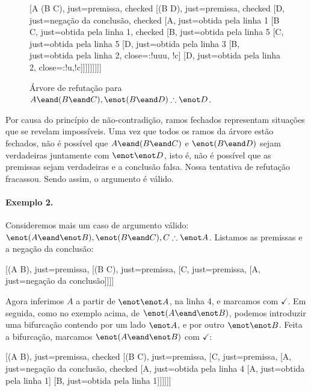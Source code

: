 \begin{figure}[h!]
\begin{center}
\begin{tableau}
	{
	}
	[A \eand (B \eand C), just={premissa}, checked
	[\enot(B \eand D), just={premissa}, checked
	[\enot \enot D, just={negação da conclusão}, checked
	[A, just={obtida pela linha 1}
	[B \eand C, just={obtida pela linha 1}, checked
	[B, just={obtida pela linha 5}
	[C, just={obtida pela linha 5}
	[D, just={obtida pela linha 3}
		[\enot B, just={obtida pela linha 2}, close={:!uuu, !c}]
		[\enot D, just={obtida pela linha 2}, close={:!u,!c}]]]]]]]]]
\end{tableau}
\end{center}
	\caption{Árvore de refutação para $A \eand (B \eand C), \enot(B \eand D) \therefore \enot D$.}
	\label{truth.trees.ex.1}
\end{figure}

Por causa do princípio de não-contradição, ramos fechados representam situações que se revelam impossíveis.
Uma vez que todos os ramos da árvore estão fechados, não é possível que $A \eand (B \eand C)$ e $\enot(B \eand D)$ sejam verdadeiras juntamente com $\enot \enot D$, isto é, não é possível que as premissas sejam verdadeiras e a conclusão falsa.
Nossa tentativa de refutação fracassou.
Sendo assim, o argumento é válido.

\paragraph{Exemplo 2.}
Consideremos mais um caso de argumento válido: $\enot(A \eand \enot B), \enot(B \eand C), C \therefore \enot A$.
Listamos as premissas e a negação da conclusão:

\begin{center}
	\begin{tableau}
		{
		}
		[\enot(A \eand \enot B), just=premissa, 
		[\enot(B \eand C), just=premissa, 
		[C, just=premissa, 
		[\enot \enot A, just={negação da conclusão}]]]]
	\end{tableau}
\end{center}

Agora inferimos $A$ a partir de $\enot \enot A$, na linha 4, e marcamos com $\checkmark$. 
Em seguida, como no exemplo acima, de $\enot(A \eand \enot B)$, podemos introduzir uma bifurcação contendo por um lado $\enot A$, e por outro  $\enot \enot B$.
Feita a bifurcação, marcamos $\enot(A \eand \enot B)$ com $\checkmark$:

\begin{center}
	\begin{tableau}
		{
		}
		[\enot(A \eand \enot B), just=premissa, checked
		[\enot(B \eand C), just=premissa, 
		[C, just=premissa, 
		[\enot \enot A, just={negação da conclusão}, checked
		[A, just={obtida pela linha 4}
			[\enot A, just={obtida pela linha 1}]
			[\enot \enot B, just={obtida pela linha 1}]]]]]]
	\end{tableau}
\end{center}


